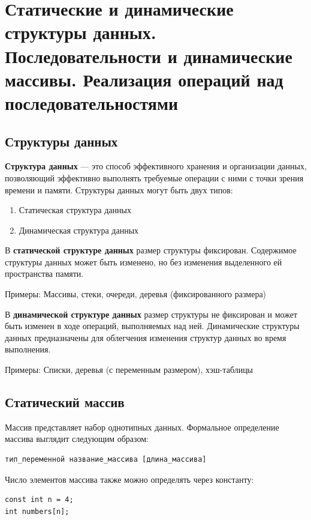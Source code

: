 \section{Статические и динамические структуры данных. Последовательности и динамические массивы. Реализация операций над последовательностями} \label{static_and_dynamic_data_structures}

\subsection{Структуры данных}

\textbf{Структура данных} — это способ эффективного хранения и организации данных, позволяющий эффективно выполнять требуемые операции с ними с точки зрения времени и памяти. Структуры данных могут быть двух типов:
\begin{enumerate}
    \item Статическая структура данных
    \item Динамическая структура данных
\end{enumerate}

В \textbf{статической структуре данных} размер структуры фиксирован. Содержимое структуры данных может быть изменено, но без изменения выделенного ей пространства памяти.

Примеры: Массивы, стеки, очереди, деревья (фиксированного размера)

В \textbf{динамической структуре данных} размер структуры не фиксирован и может быть изменен в ходе операций, выполняемых над ней. Динамические структуры данных предназначены для облегчения изменения структур данных во время выполнения.

Примеры: Списки, деревья (с переменным размером), хэш-таблицы

\subsection{Статический массив}

Массив представляет набор однотипных данных. Формальное определение массива выглядит следующим образом:

\begin{verbatim}
тип_переменной название_массива [длина_массива]
\end{verbatim}

Число элементов массива также можно определять через константу:

\begin{verbatim}
const int n = 4;
int numbers[n];
\end{verbatim}

